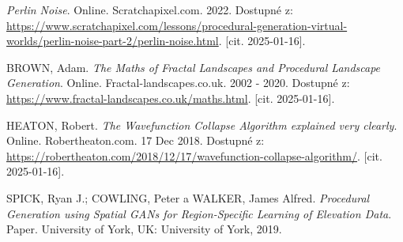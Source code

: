 \begin{thebibliography}{99}
    \textit{Perlin Noise}. Online. Scratchapixel.com. 2022. Dostupné z: \url{https://www.scratchapixel.com/lessons/procedural-generation-virtual-worlds/perlin-noise-part-2/perlin-noise.html}. [cit. 2025-01-16].


    BROWN, Adam. \textit{The Maths of Fractal Landscapes and Procedural Landscape Generation}. Online. Fractal-landscapes.co.uk. 2002 - 2020. Dostupné z: \url{https://www.fractal-landscapes.co.uk/maths.html}. [cit. 2025-01-16].

    HEATON, Robert. \textit{The Wavefunction Collapse Algorithm explained very clearly}. Online. Robertheaton.com. 17 Dec 2018. Dostupné z: \url{https://robertheaton.com/2018/12/17/wavefunction-collapse-algorithm/}. [cit. 2025-01-16].

    SPICK, Ryan J.; COWLING, Peter a WALKER, James Alfred. \textit{Procedural Generation using Spatial GANs for Region-Specific Learning of Elevation Data}. Paper. University of York, UK: University of York, 2019.


    
\end{thebibliography}